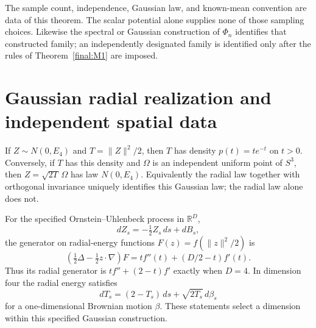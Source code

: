 The sample count, independence, Gaussian law, and known-mean convention
are data of this theorem.  The scalar potential alone supplies none
of those sampling choices.  Likewise the spectral or Gaussian
construction of $\Phi_n$ identifies that constructed family; an
independently designated family is identified only after the rules
of Theorem~\ref{final:M1} are imposed.

\section{Gaussian radial realization and independent spatial data}
\label{final:spatial}

\begin{theorem}
\label{final:R1}
If $Z\sim N(0,E_4)$ and $T=\|Z\|^2/2$, then $T$ has density
$p(t)=te^{-t}$ on $t>0$.  Conversely, if $T$ has this density and
$\Omega$ is an independent uniform point of $S^3$, then
$Z=\sqrt{2T}\,\Omega$ has law $N(0,E_4)$.  Equivalently the radial
law together with orthogonal invariance uniquely identifies this
Gaussian law; the radial law alone does not.

For the specified Ornstein--Uhlenbeck process in $\mathbb R^D$,
\[
 dZ_s=-\tfrac12Z_s\,ds+dB_s,
\]
the generator on radial-energy functions $F(z)=f(\|z\|^2/2)$ is
\[
 \left(\tfrac12\Delta-\tfrac12z\cdot\nabla\right)F
       =t f''(t)+(D/2-t)f'(t).
\]
Thus its radial generator is $tf''+(2-t)f'$ exactly when $D=4$.
In dimension four the radial energy satisfies
\[
 dT_s=(2-T_s)\,ds+\sqrt{2T_s}\,d\beta_s
\]
for a one-dimensional Brownian motion $\beta$.  These statements
select a dimension within this specified Gaussian construction.
\end{theorem}

